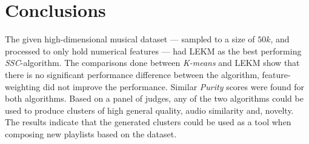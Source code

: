 \documentclass[../report.tex]{subfiles}
\begin{document}
\chapter{Conclusions}
The given high-dimensional musical dataset --- sampled to a size of $50k$, and processed to only hold numerical features --- had LEKM as the best performing \textit{SSC}-algorithm. The comparisons done between \textit{K-means} and LEKM show that there is no significant performance difference between the algorithm, feature-weighting did not improve the performance. Similar \textit{Purity} scores were found for both algorithms. Based on a panel of judges, any of the two algorithms could be used to produce clusters of high general quality, audio similarity and, novelty. The results indicate that the generated clusters could be used as a tool when composing new playlists based on the dataset.
\end{document}
